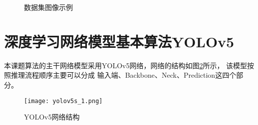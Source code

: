 \begin{figure}[!h]
    \setlength{\subfigcapskip}{-1bp}

    \centering
    \begin{minipage}{\textwidth}
    \centering
    \subfigure{\label{dataset11}}\addtocounter{subfigure}{-2}
    \hspace{2em}
    \subfigure{\label{dataset12}}\addtocounter{subfigure}{-2}
    \end{minipage}

    \centering
    \begin{minipage}{\textwidth}
    \centering
    \subfigure{\label{dataset21}}\addtocounter{subfigure}{-2}
    \hspace{2em}
    \subfigure{\label{dataset22}}\addtocounter{subfigure}{-2}
    \end{minipage}

    \centering
    \begin{minipage}{\textwidth}
    \centering
    \subfigure{\label{dataset31}}\addtocounter{subfigure}{-2}
    \hspace{2em}
    \subfigure{\label{dataset32}}\addtocounter{subfigure}{-2}
    \end{minipage}

    \vspace{0.2em}
    \caption{数据集图像示例}
    {\label{dataset}}
\end{figure}


\section{深度学习网络模型基本算法YOLOv5}
本课题算法的主干网络模型采用YOLOv5网络，网络的结构如图\ref{yolo1}所示，
该模型按照推理流程顺序主要可以分成
输入端、Backbone、Neck、Prediction这四个部分。

\begin{figure}[h]
    \centering
    \texttt{[image: yolov5s\_1.png]}
    \caption{YOLOv5网络结构}
    \label{yolo1}
\end{figure}

